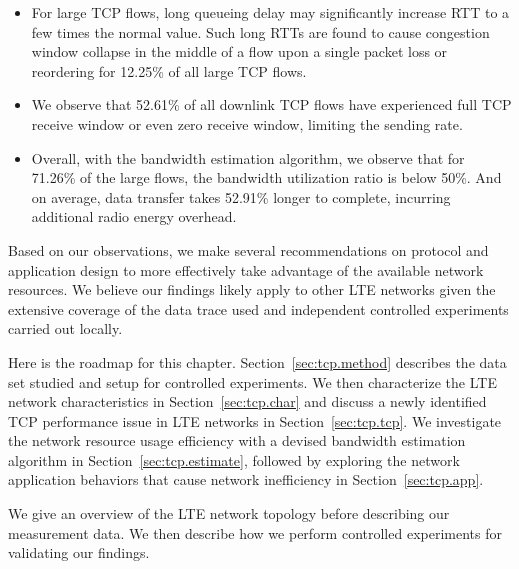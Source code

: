 \begin{itemize}
\item For large TCP flows, long queueing delay may significantly increase RTT to a few times the normal value. Such long RTTs are found to cause congestion window collapse in the middle of a flow upon a single packet loss or reordering for 12.25\% of all large TCP flows.
\item We observe that 52.61\% of all downlink TCP flows have experienced full TCP receive window or even zero receive window, limiting the sending rate.
\item Overall, with the bandwidth estimation algorithm, we observe
that for 71.26\% of the large flows, the bandwidth utilization ratio
is below 50\%. And on average, data transfer takes 52.91\% longer to
complete, incurring additional radio energy overhead.
\end{itemize}

Based on our observations, we make several recommendations on protocol and application design to more effectively take
advantage of the available network resources. We believe our findings likely apply to other LTE networks given the extensive coverage of the data trace used and independent controlled experiments carried out locally.

Here is the roadmap for this chapter. Section~\ref{sec:tcp.method} describes the data set studied and setup for controlled experiments. We then characterize the LTE network characteristics in Section~\ref{sec:tcp.char} and discuss a newly identified TCP performance issue in LTE networks in Section~\ref{sec:tcp.tcp}. We investigate the network resource usage efficiency with a devised bandwidth estimation algorithm in Section~\ref{sec:tcp.estimate}, followed by exploring the network application behaviors that cause network inefficiency in Section~\ref{sec:tcp.app}.


\label{sec:tcp.method}

We give an overview of the LTE network topology before describing our measurement data. We then describe how we perform controlled experiments for validating our findings.

\label{sec:tcp.data}


\begin{figure}[t]
\centering
{}\\
\label{fig:tcp.architecture}
\end{figure}


